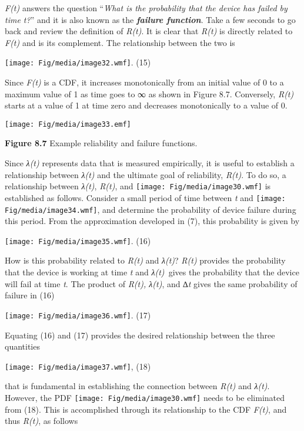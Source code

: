 \emph{F(t)} answers the question ``\emph{What is the probability that
the device has failed by time t?}'' and it is also known as the
\emph{\textbf{failure function}}. Take a few seconds to go back and
review the definition of \emph{R(t)}. It is clear that \emph{R(t)} is
directly related to \emph{F(t)} and is its complement. The relationship
between the two is

\texttt{[image: Fig/media/image32.wmf]}. (15)

Since \emph{F(t)} is a CDF, it increases monotonically from an initial
value of 0 to a maximum value of 1 as time goes to ∞ as shown in Figure
8.7. Conversely, \emph{R(t)} starts at a value of 1 at time zero and
decreases monotonically to a value of 0.

\texttt{[image: Fig/media/image33.emf]}

\textbf{Figure 8.7} Example reliability and failure functions.

Since \emph{λ(t)} represents data that is measured empirically, it is
useful to establish a relationship between \emph{λ(t)} and the ultimate
goal of reliability, \emph{R(t)}. To do so, a relationship between
\emph{λ(t)}, \emph{R(t)}, and \texttt{[image: Fig/media/image30.wmf]} is
established as follows. Consider a small period of time between \emph{t}
and \texttt{[image: Fig/media/image34.wmf]}, and determine the
probability of device failure during this period. From the approximation
developed in (7), this probability is given by

\texttt{[image: Fig/media/image35.wmf]}. (16)

How is this probability related to \emph{R(t)} and \emph{λ(t)}?
\emph{R(t)} provides the probability that the device is working at time
\emph{t} and \emph{λ(t)~}gives the probability that the device will fail
at time \emph{t}. The product of \emph{R(t), λ(t)}, and ∆\emph{t} gives
the same probability of failure in (16)

\texttt{[image: Fig/media/image36.wmf]}. (17)

Equating (16) and (17) provides the desired relationship between the
three quantities

\texttt{[image: Fig/media/image37.wmf]}, (18)

that is fundamental in establishing the connection between \emph{R(t)}
and \emph{λ(t)}. However, the PDF
\texttt{[image: Fig/media/image30.wmf]} needs to be eliminated from
(18). This is accomplished through its relationship to the CDF
\emph{F(t)}, and thus \emph{R(t)}, as follows


